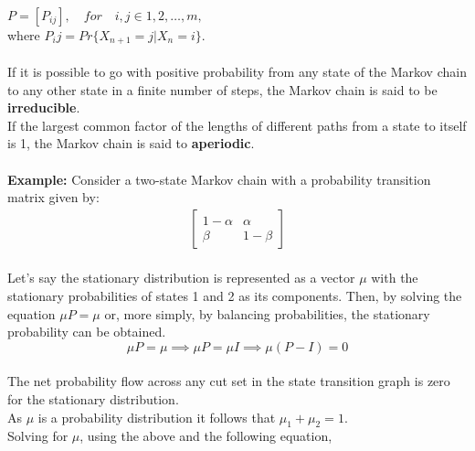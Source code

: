 \documentclass[10pt,twocolumn,letterpaper]{article}
\begin{document}
\begin{math}
 P = [P_{ij} ], \quad for \quad i, j \in {1, 2, \dots , m}, 
\end{math}
\\ where \begin{math} P_ij = Pr\{X_{n+1} = j |X_n = i\}. \end{math} \\
\\
If it is possible to go with positive probability from any state of the
Markov chain to any other state in a ﬁnite number of steps, the Markov
chain is said to be \textbf{irreducible}. \\If the largest common factor of the lengths
of different paths from a state to itself is 1, the Markov chain is said to
\textbf{aperiodic}.\\
\\ 
\textbf{Example: }Consider a two-state Markov chain with a probability transition matrix given by: 
 \begin{eqnarray*}
\begin{bmatrix}
{1 - \alpha} & \alpha \\
\beta & 1 - \beta
\end{bmatrix}
\end{eqnarray*}
\\
Let's say the stationary distribution is represented as a vector \begin{math}
 \mu \end{math} with the stationary probabilities of states 1 and 2 as its components. Then, by solving the equation \begin{math}
  \mu P = \mu \end{math} or, more simply, by balancing probabilities, the stationary probability can be obtained. 
  \begin{equation*}
      \mu P = \mu \implies \mu P = \mu I \implies \mu(P - I) = 0 
  \end{equation*}
  \\The net probability flow across any cut set in the state transition graph is zero for the stationary distribution. \\ As \begin{math}
   \mu \end{math} is a probability distribution it follows that \begin{math} \mu_1 + \mu_2 = 1. \end{math} \\ Solving for \begin{math} \mu\end{math}, using the above and the following equation, \quad
\end{document}
